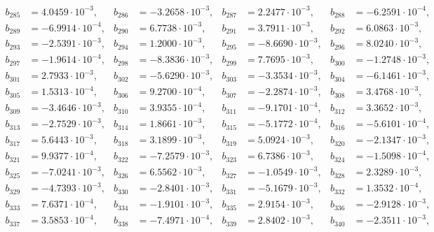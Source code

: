 \begin{align*}
b_{ 285 } &= 4.0459 \cdot 10^{ -3 }, & b_{ 286 } &= -3.2658 \cdot 10^{ -3 }, & b_{ 287 } &= 2.2477 \cdot 10^{ -3 }, & b_{ 288 } &= -6.2591 \cdot 10^{ -4 },\\ 
b_{ 289 } &= -6.9914 \cdot 10^{ -4 }, & b_{ 290 } &= 6.7738 \cdot 10^{ -3 }, & b_{ 291 } &= 3.7911 \cdot 10^{ -3 }, & b_{ 292 } &= 6.0863 \cdot 10^{ -3 },\\ 
b_{ 293 } &= -2.5391 \cdot 10^{ -3 }, & b_{ 294 } &= 1.2000 \cdot 10^{ -3 }, & b_{ 295 } &= -8.6690 \cdot 10^{ -3 }, & b_{ 296 } &= 8.0240 \cdot 10^{ -3 },\\ 
b_{ 297 } &= -1.9614 \cdot 10^{ -4 }, & b_{ 298 } &= -8.3836 \cdot 10^{ -3 }, & b_{ 299 } &= 7.7695 \cdot 10^{ -3 }, & b_{ 300 } &= -1.2748 \cdot 10^{ -3 },\\ 
b_{ 301 } &= 2.7933 \cdot 10^{ -3 }, & b_{ 302 } &= -5.6290 \cdot 10^{ -3 }, & b_{ 303 } &= -3.3534 \cdot 10^{ -3 }, & b_{ 304 } &= -6.1461 \cdot 10^{ -3 },\\ 
b_{ 305 } &= 1.5313 \cdot 10^{ -4 }, & b_{ 306 } &= 9.2700 \cdot 10^{ -4 }, & b_{ 307 } &= -2.2874 \cdot 10^{ -3 }, & b_{ 308 } &= 3.4768 \cdot 10^{ -3 },\\ 
b_{ 309 } &= -3.4646 \cdot 10^{ -3 }, & b_{ 310 } &= 3.9355 \cdot 10^{ -4 }, & b_{ 311 } &= -9.1701 \cdot 10^{ -4 }, & b_{ 312 } &= 3.3652 \cdot 10^{ -3 },\\ 
b_{ 313 } &= -2.7529 \cdot 10^{ -3 }, & b_{ 314 } &= 1.8661 \cdot 10^{ -3 }, & b_{ 315 } &= -5.1772 \cdot 10^{ -4 }, & b_{ 316 } &= -5.6101 \cdot 10^{ -4 },\\ 
b_{ 317 } &= 5.6443 \cdot 10^{ -3 }, & b_{ 318 } &= 3.1899 \cdot 10^{ -3 }, & b_{ 319 } &= 5.0924 \cdot 10^{ -3 }, & b_{ 320 } &= -2.1347 \cdot 10^{ -3 },\\ 
b_{ 321 } &= 9.9377 \cdot 10^{ -4 }, & b_{ 322 } &= -7.2579 \cdot 10^{ -3 }, & b_{ 323 } &= 6.7386 \cdot 10^{ -3 }, & b_{ 324 } &= -1.5098 \cdot 10^{ -4 },\\ 
b_{ 325 } &= -7.0241 \cdot 10^{ -3 }, & b_{ 326 } &= 6.5562 \cdot 10^{ -3 }, & b_{ 327 } &= -1.0549 \cdot 10^{ -3 }, & b_{ 328 } &= 2.3289 \cdot 10^{ -3 },\\ 
b_{ 329 } &= -4.7393 \cdot 10^{ -3 }, & b_{ 330 } &= -2.8401 \cdot 10^{ -3 }, & b_{ 331 } &= -5.1679 \cdot 10^{ -3 }, & b_{ 332 } &= 1.3532 \cdot 10^{ -4 },\\ 
b_{ 333 } &= 7.6371 \cdot 10^{ -4 }, & b_{ 334 } &= -1.9101 \cdot 10^{ -3 }, & b_{ 335 } &= 2.9154 \cdot 10^{ -3 }, & b_{ 336 } &= -2.9128 \cdot 10^{ -3 },\\ 
b_{ 337 } &= 3.5853 \cdot 10^{ -4 }, & b_{ 338 } &= -7.4971 \cdot 10^{ -4 }, & b_{ 339 } &= 2.8402 \cdot 10^{ -3 }, & b_{ 340 } &= -2.3511 \cdot 10^{ -3 },\\ 

\end{align*}
